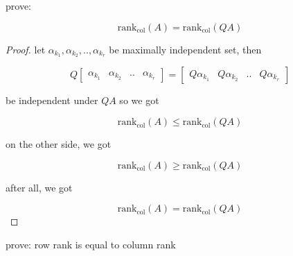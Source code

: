 \begin{exercise}
    prove: 
    
    \[
        \mathrm{rank}_{\mathrm{col}}(A) =\mathrm{rank}_{\mathrm{col}}(QA)
    \]
\end{exercise}

\begin{proof}
    let $\alpha_{k_1}, \alpha_{k_2}, .., \alpha_{k_r}$ be maximally independent set, then

    \[
        Q \begin{bmatrix}
        \alpha_{k_1} &  \alpha_{k_2} &  .. & \alpha_{k_r}
        \end{bmatrix} = \begin{bmatrix}
        Q\alpha_{k_1} &  Q\alpha_{k_2} &  .. & Q\alpha_{k_r}
        \end{bmatrix}
    \]

    be independent under $QA$ so we got

    \[
        \mathrm{rank}_{\mathrm{col}}(A) \le \mathrm{rank}_{\mathrm{col}}(QA)
    \]

    on the other side, we got


    \[
        \mathrm{rank}_{\mathrm{col}}(A) \ge \mathrm{rank}_{\mathrm{col}}(QA)
    \]

    after all, we got


    \[
        \mathrm{rank}_{\mathrm{col}}(A)= \mathrm{rank}_{\mathrm{col}}(QA)
    \]
\end{proof}




\begin{exercise}
    prove: row rank is equal to column rank 
\end{exercise}

